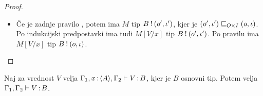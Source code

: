 \begin{proof}
\begin{itemize}
		\item Če je zadnje pravilo , potem ima $M$ tip $B \mathbin{!} (o', \iota')$, kjer je $(o', \iota') \sqsubseteq_{O \times I} (o, \iota)$.
		Po indukcijski predpostavki ima tudi $M[V/x]$ tip $B \mathbin{!} (o', \iota')$. Po pravilu  ima $M[V/x]$ tip $B \mathbin{!} (o, \iota)$.
		
	\end{itemize}

\end{proof}

\begin{lema}\label{lem:tovor-osnovni-tip-skrcitev}
	Naj za vrednost $V$ velja $\Gamma_1, x \mathinner{:} \langle A \rangle, \Gamma_2 \vdash V \mathinner{:} B$, kjer je $B$ osnovni tip. Potem velja $\Gamma_1, \Gamma_2 \vdash V \mathinner{:} B$.
\end{lema}

